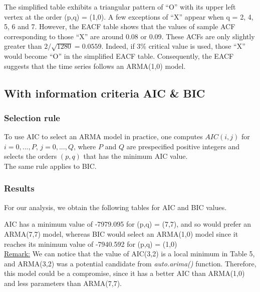 The simplified  table exhibits  a  triangular  pattern  of  “O”  with  its  upper  left  vertex  at  the  order  (p,q) = (1,0).
A few exceptions of “X” appear when q = 2, 4, 5, 6 and 7.
However, the EACF table  shows  that  the  values  of  sample  ACF  corresponding  to  those  “X”  are  around 0.08 or 0.09.
These ACFs are only slightly greater than $2 / \sqrt{1280} = 0.0559$. Indeed, if 3\% critical value is used, those “X” would become “O” in the simplified EACF table.
Consequently,  the  EACF  suggests  that  the  time series  follows an ARMA(1,0) model.


\subsection{With information criteria AIC \& BIC}

\subsubsection{Selection rule}
To use AIC to select an ARMA model in practice, one computes $AIC(i,j)$ for $i = 0,...,P$, $j = 0,...,Q$, where $P$ and $Q$ are prespecified positive integers and selects the orders $(p,q)$ that has the minimum AIC value.
\\
The same rule applies to BIC.
\\

\subsubsection{Results}
For our analysis, we obtain the following tables for AIC and BIC values.

AIC has a minimum value of -7979.095 for (p,q) = (7,7), and so would prefer an ARMA(7,7) model, whereas BIC would select an ARMA(1,0) model since it reaches its minimum value of -7940.592 for (p,q) = (1,0) \\

\underline{Remark:} We can notice that the value of AIC(3,2) is a local minimum in Table 5, and ARMA(3,2) was a potential candidate from \textit{auto.arima()} function. Therefore, this model could be a compromise, since it has a better AIC than ARMA(1,0) and less parameters than ARMA(7,7). \\

